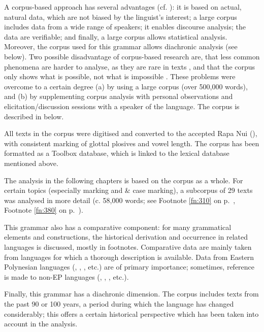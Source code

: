 A corpus-based approach has several advantages (cf. \citealt[12]{McEneryWilson1996}): it is based on actual, natural data, which are not biased by the linguist’s interest; a large corpus includes data from a wide range of speakers; it enables discourse analysis; the data are verifiable; and finally, a large corpus allows statistical analysis. Moreover, the corpus used for this grammar allows diachronic analysis (see below). Two possible disadvantage of corpus-based research are, that less common phenomena are harder to analyse, as they are rare in texts \citep{Chapin1978}, and that the corpus only shows what is possible, not what is impossible \citep[412]{Biggs1974}. These problems were overcome to a certain degree (a) by using a large corpus (over 500,000 words), and (b) by supplementing corpus analysis with personal observations and elicitation/discussion sessions with a speaker of the language. The corpus is described in  below.

All texts in the corpus were digitised and converted to the accepted Rapa Nui  (), with consistent marking of glottal plosives and vowel length. The corpus has been formatted as a Toolbox database, which is linked to the lexical database mentioned above.

The analysis in the following chapters is based on the corpus as a whole. For certain topics (especially  marking and  \& case marking), a subcorpus of 29 texts was analysed in more detail (c. 58,000 words; see Footnote \ref{fn:310} on p.~\pageref{fn:310}, Footnote \ref{fn:380} on p.~\pageref{fn:380}).

This grammar also has a comparative component: for many grammatical elements and constructions, the historical derivation and occurrence in related languages is discussed, mostly in footnotes. Comparative data are mainly taken from languages for which a thorough description is available. Data from Eastern Polynesian languages (, , , etc.) are of primary importance; sometimes, reference is made to non-EP languages (, , , etc.). 

Finally, this grammar has a diachronic dimension. The corpus includes texts from the past 90 or 100 years, a period during which the language has changed considerably; this offers a certain historical perspective which has been taken into account in the analysis.

